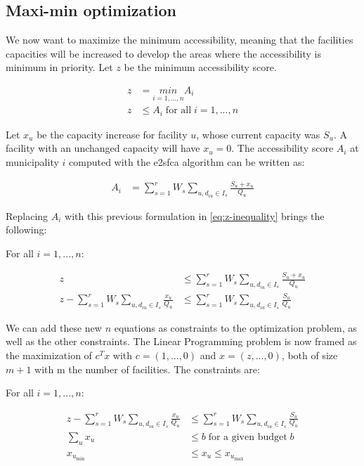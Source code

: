 \subsection{Maxi-min optimization}

We now want to maximize the minimum accessibility, meaning that the facilities
capacities will be increased to develop the areas where the accessibility is
minimum in priority. Let $z$ be the minimum accessibility score.

\begin{align}
    z & = \underset{i=1, ..., n}{min} A_i       \\
    z & \leq A_i \; \text{for all} \; i=1,...,n
    \label{eq:z-inequality}
\end{align}

Let $x_u$ be the capacity increase for facility $u$,
whose current capacity was $S_u$. A facility with an unchanged capacity will
have $x_u=0$. The accessibility score $A_i$ at municipality $i$ computed with the
\ac{e2sfca} algorithm can be written as:

\begin{align*}
    A_i & = \sum_{s=1}^{r} W_s \sum_{u,d_{iu} \in I_s} \frac{S_u + x_u}{Q_u}
    \label{eq:A_i}
\end{align*}

Replacing $A_i$ with this previous formulation in \cref{eq:z-inequality} brings
the following:

For all $i=1, ... ,n$:

\begin{align*}
    z                                                              & \leq \sum_{s=1}^{r} W_s \sum_{u, d_{iu} \in I_s} \frac{S_u + x_u}{Q_u} \\
    z - \sum_{s=1}^{r} W_s \sum_{u,d_{iu} \in I_s} \frac{x_u}{Q_u} & \leq \sum_{s=1}^{r} W_s \sum_{u,d_{iu} \in I_s} \frac{S_u}{Q_u}
\end{align*}

We can add these new $n$ equations as constraints to the optimization problem,
as well as the other constraints. The Linear Programming problem is now framed
as the maximization of $c^T x$ with $c=(1, ... ,0)$ and $x=(z, ... ,0)$, both of
size $m+1$ with m the number of facilities. The constraints are:

For all $i=1, ... ,n$:

\begin{align*}
    z - \sum_{s=1}^{r} W_s \sum_{u,d_{iu} \in I_s} \frac{x_u}{Q_u} & \leq \sum_{s=1}^{r} W_s \sum_{u,d_{iu} \in I_s} \frac{S_u}{Q_u} \\
    \sum_{u} x_u                                                   & \leq b \; \text{for a given budget} \; b                        \\
    x_{u_\text{min}}                                               & \leq x_u \leq x_{u_\text{max}}
\end{align*}

